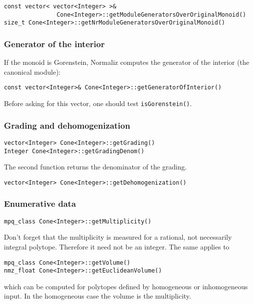 \begin{small}
\begin{Verbatim}
const vector< vector<Integer> >& 
               Cone<Integer>::getModuleGeneratorsOverOriginalMonoid()
size_t Cone<Integer>::getNrModuleGeneratorsOverOriginalMonoid()
\end{Verbatim}

\subsubsection{Generator of the interior}\label{GenInt}

If the monoid is Gorenstein, Normaliz computes the generator of the interior (the canonical module):
\begin{Verbatim}
const vector<Integer>& Cone<Integer>::getGeneratorOfInterior()
\end{Verbatim}
Before asking for this vector, one should test \verb|isGorenstein()|.

\subsubsection{Grading and dehomogenization}

\begin{Verbatim}
vector<Integer> Cone<Integer>::getGrading()
Integer Cone<Integer>::getGradingDenom()
\end{Verbatim}
The second function returns the denominator of the grading.

\begin{Verbatim}
vector<Integer> Cone<Integer>::getDehomogenization()
\end{Verbatim}

\subsubsection{Enumerative data}

\begin{Verbatim}
mpq_class Cone<Integer>::getMultiplicity()
\end{Verbatim}
Don't forget that the multiplicity is measured for a rational, not necessarily integral polytope. Therefore it need not be an integer. The same applies to
\begin{Verbatim}
mpq_class Cone<Integer>::getVolume()
nmz_float Cone<Integer>::getEuclideanVolume()
\end{Verbatim}
which can be computed for polytopes defined by homogeneous or inhomogeneous input. In the homogeneous case the volume is the multiplicity.


\end{small}
